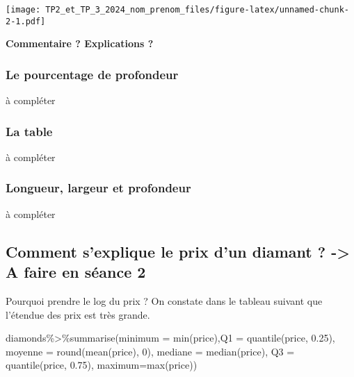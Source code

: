 \documentclass[
]{article}
\newenvironment{Shaded}{\begin{snugshade}}{\end{snugshade}}
\newcommand{\AttributeTok}[1]{\textcolor[rgb]{0.77,0.63,0.00}{#1}}
\newcommand{\DecValTok}[1]{\textcolor[rgb]{0.00,0.00,0.81}{#1}}
\newcommand{\FloatTok}[1]{\textcolor[rgb]{0.00,0.00,0.81}{#1}}
\newcommand{\FunctionTok}[1]{\textcolor[rgb]{0.00,0.00,0.00}{#1}}
\newcommand{\NormalTok}[1]{#1}
\newcommand{\SpecialCharTok}[1]{\textcolor[rgb]{0.00,0.00,0.00}{#1}}
\begin{document}
\texttt{[image: TP2\_et\_TP\_3\_2024\_nom\_prenom\_files/figure-latex/unnamed-chunk-2-1.pdf]}

\textbf{Commentaire ? Explications ?}

\hypertarget{le-pourcentage-de-profondeur}{%
\subsubsection{Le pourcentage de
profondeur}\label{le-pourcentage-de-profondeur}}

à compléter

\hypertarget{la-table}{%
\subsubsection{La table}\label{la-table}}

à compléter

\hypertarget{longueur-largeur-et-profondeur}{%
\subsubsection{Longueur, largeur et
profondeur}\label{longueur-largeur-et-profondeur}}

à compléter

\hypertarget{comment-sexplique-le-prix-dun-diamant---a-faire-en-suxe9ance-2}{%
\subsection{Comment s'explique le prix d'un diamant ? -\textgreater{} A
faire en séance
2}\label{comment-sexplique-le-prix-dun-diamant---a-faire-en-suxe9ance-2}}

Pourquoi prendre le log du prix ? On constate dans le tableau suivant
que l'étendue des prix est très grande.

\begin{Shaded}
\begin{Highlighting}[]
\NormalTok{diamonds}\SpecialCharTok{\%\textgreater{}\%}\FunctionTok{summarise}\NormalTok{(}\AttributeTok{minimum =} \FunctionTok{min}\NormalTok{(price),}\AttributeTok{Q1 =} \FunctionTok{quantile}\NormalTok{(price, }\FloatTok{0.25}\NormalTok{), }\AttributeTok{moyenne =} \FunctionTok{round}\NormalTok{(}\FunctionTok{mean}\NormalTok{(price), }\DecValTok{0}\NormalTok{),  }\AttributeTok{mediane =} \FunctionTok{median}\NormalTok{(price), }\AttributeTok{Q3 =} \FunctionTok{quantile}\NormalTok{(price, }\FloatTok{0.75}\NormalTok{), }\AttributeTok{maximum=}\FunctionTok{max}\NormalTok{(price))}
\end{Highlighting}
\end{Shaded}
\end{document}
